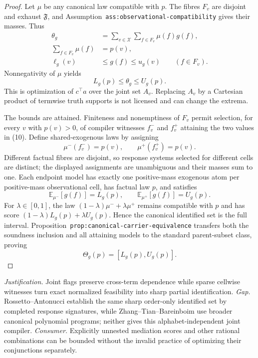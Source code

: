 \documentclass{article}
\begin{document}
\begin{proof}
Let \(\mu\) be any canonical law compatible with \(p\). The fibres \(F_v\) are disjoint and exhaust \(\mathfrak F\), and Assumption~\texttt{ass:observational-compatibility} gives their masses. Thus
\[
 \begin{aligned}
 \theta_g&=\sum_{v\in\mathcal X}\sum_{f\in F_v}\mu(f)g(f),\\
 \sum_{f\in F_v}\mu(f)&=p(v),\\
 \ell_g(v)&\leq g(f)\leq u_g(v)\qquad(f\in F_v).
 \end{aligned}
\]
Nonnegativity of \(\mu\) yields
\[
 L_g(p)\leq\theta_g\leq U_g(p).
 \tag{11}
\]
This is optimization of \(c^\top a\) over the joint set \(A_v\). Replacing \(A_v\) by a Cartesian product of termwise truth supports is not licensed and can change the extrema.

The bounds are attained. Finiteness and nonemptiness of \(F_v\) permit selection, for every \(v\) with \(p(v)>0\), of compiler witnesses \(f_v^-\) and \(f_v^+\) attaining the two values in (10). Define shared-exogenous laws by assigning
\[
 \mu^-(f_v^-)=p(v),
 \qquad
 \mu^+(f_v^+)=p(v).
\]
Different factual fibres are disjoint, so response systems selected for different cells are distinct; the displayed assignments are unambiguous and their masses sum to one. Each endpoint model has exactly one positive-mass exogenous atom per positive-mass observational cell, has factual law \(p\), and satisfies
\[
 \mathbb E_{\mu^-}[g(f)]=L_g(p),
 \qquad
 \mathbb E_{\mu^+}[g(f)]=U_g(p).
\]
For \(\lambda\in[0,1]\), the law \((1-\lambda)\mu^-+\lambda\mu^+\) remains compatible with \(p\) and has score \((1-\lambda)L_g(p)+\lambda U_g(p)\). Hence the canonical identified set is the full interval. Proposition~\texttt{prop:canonical-carrier-equivalence} transfers both the soundness inclusion and all attaining models to the standard parent-subset class, proving
\[
 \Theta_g(p)=[L_g(p),U_g(p)].
\]
\end{proof}
\par\smallskip\noindent \textit{Justification.} Joint flags preserve cross-term dependence while sparse cellwise witnesses turn exact normalized feasibility into sharp partial identification. \textit{Gap.} Rossetto--Antonucci establish the same sharp order-only identified set by completed response signatures, while Zhang--Tian--Bareinboim use broader canonical polynomial programs; neither gives this alphabet-independent joint compiler. \textit{Consumer.} Explicitly unnested mediation scores and other rational combinations can be bounded without the invalid practice of optimizing their conjunctions separately.
\end{document}
